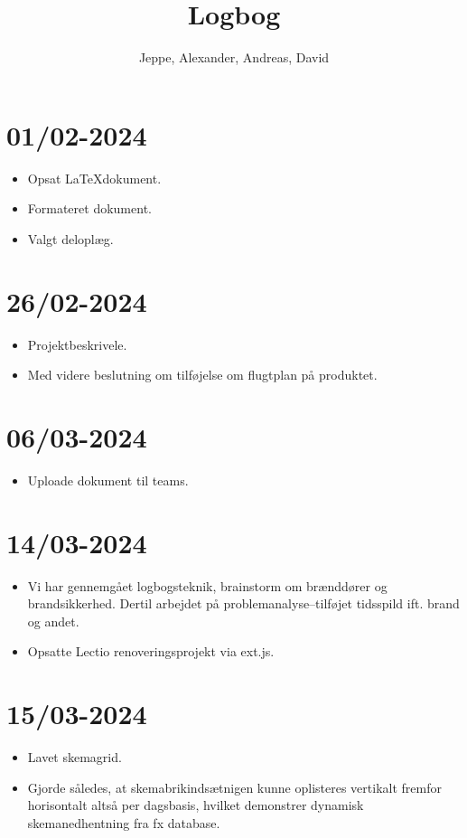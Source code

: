 \documentclass[12pt, a4paper]{article}
\title{Logbog}
\author{Jeppe, Alexander, Andreas, David}
\date{}
\begin{document}
    \maketitle
    \tableofcontents
    \newpage

    \section{01/02-2024}
        \begin{itemize}
            \item Opsat \LaTeX dokument.
            \item Formateret dokument.
            \item Valgt deloplæg.
        \end{itemize}

    \section{26/02-2024}
        \begin{itemize}
            \item Projektbeskrivele.
            \item Med videre beslutning om tilføjelse om flugtplan på produktet.
        \end{itemize}

    \section{06/03-2024}
        \begin{itemize}
            \item Uploade dokument til teams. 
        \end{itemize}

    \section{14/03-2024}
        \begin{itemize}
            \item Vi har gennemgået logbogsteknik, brainstorm om brænddører og brandsikkerhed. Dertil arbejdet på problemanalyse--tilføjet tidsspild ift. brand og andet.
            \item Opsatte Lectio renoveringsprojekt via ext.js.
        \end{itemize}

    \section{15/03-2024}
        \begin{itemize}
            \item Lavet skemagrid.
            \item Gjorde således, at skemabrikindsætnigen kunne oplisteres vertikalt fremfor horisontalt altså per dagsbasis, hvilket demonstrer dynamisk skemanedhentning fra fx database.
        \end{itemize}
\end{document}
